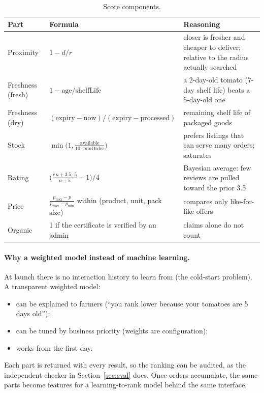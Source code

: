 \documentclass[11pt,a4paper]{article}
\begin{document}
\begin{table}[H]\centering\small
\begin{tabularx}{\linewidth}{@{}p{2.2cm}p{6.3cm}L@{}}
\toprule
\textbf{Part} & \textbf{Formula} & \textbf{Reasoning} \\
\midrule
Proximity & $1 - d/r$ & closer is fresher and cheaper to deliver; relative to the radius actually searched \\
Freshness (fresh) & $1 - \text{age}/\text{shelfLife}$ & a 2-day-old tomato (7-day shelf life) beats a 5-day-old one \\
Freshness (dry) & $(\text{expiry} - \text{now}) / (\text{expiry} - \text{processed})$ & remaining shelf life of packaged goods \\
Stock & $\min\!\big(1, \frac{\text{available}}{10 \cdot \text{minOrder}}\big)$ & prefers listings that can serve many orders; saturates \\
Rating & $\big(\frac{\bar r\,n + 3.5\cdot 5}{n + 5} - 1\big)/4$ & Bayesian average: few reviews are pulled toward the prior 3.5 \\
Price & $\frac{p_{\max} - p}{p_{\max} - p_{\min}}$ within (product, unit, pack size) & compares only like-for-like offers \\
Organic & 1 if the certificate is verified by an admin & claims alone do not count \\
\bottomrule
\end{tabularx}
\caption{Score components.}
\end{table}

\paragraph{Why a weighted model instead of machine learning.} At launch there is no interaction history to learn from (the cold-start problem). A transparent weighted model:
\begin{itemize}
  \item can be explained to farmers (``you rank lower because your tomatoes are 5 days old'');
  \item can be tuned by business priority (weights are configuration);
  \item works from the first day.
\end{itemize}
Each part is returned with every result, so the ranking can be audited, as the independent checker in Section~\ref{sec:eval} does. Once orders accumulate, the same parts become features for a learning-to-rank model behind the same interface.
\end{document}
